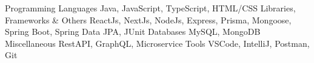 

\begin{cvskills}

  \cvskill
    {Programming Languages} %
    {Java, JavaScript, TypeScript, HTML/CSS} %
  \cvskill
    {Libraries, Frameworks \& Others} %
    {ReactJs, NextJs, NodeJs, Express, Prisma, Mongoose, Spring Boot, Spring Data JPA, JUnit} %
  \cvskill
    {Databases} %
    {MySQL, MongoDB} %
  \cvskill
    {Miscellaneous} %
    {RestAPI, GraphQL, Microservice} %
  \cvskill
    {Tools} %
    {VSCode, IntelliJ, Postman, Git} %


\end{cvskills}
